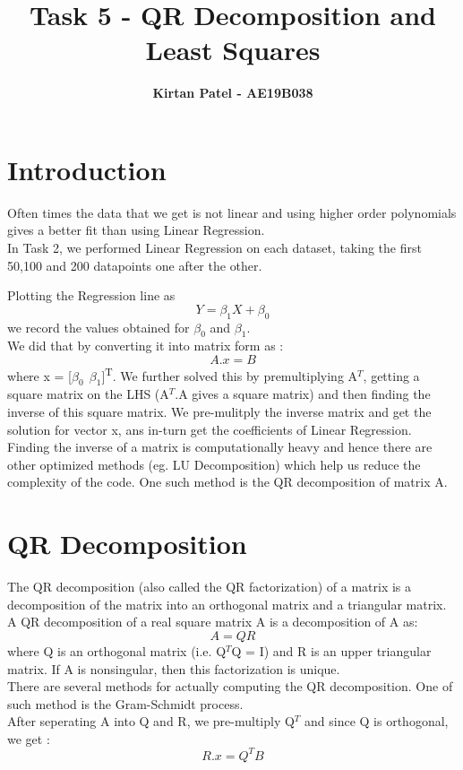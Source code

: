 \documentclass[11pt]{article}
\title{\LARGE{\bf{Task 5 - QR Decomposition and Least Squares }}}
\author{\Large{\bf{Kirtan Patel - AE19B038}}}
\date{}
\begin{document}
\maketitle 

\section{Introduction}
Often times the data that we get is not linear and using higher order polynomials gives a better fit than using Linear Regression.\\

In Task 2,  we performed Linear Regression on each dataset, taking the first 50,100 and 200 datapoints one after the other.

Plotting the Regression line as 
\[Y = \beta_1 X + \beta_0\]
we record the values obtained for $\beta_0$ and $\beta_1$.\\

We did that by converting it into matrix form as : 
\[A.x = B\] 
where x = [$\beta_0~~\beta_1$]\textsuperscript{T}. We further solved this by premultiplying A$^T$, getting a square matrix on the LHS (A$^T$.A gives a square matrix) and then finding the inverse of this square matrix. We pre-mulitply the inverse matrix and get the solution for vector x, ans in-turn get the coefficients of Linear Regression.\\

Finding the inverse of a matrix is computationally heavy and hence there are other optimized methods (eg. LU Decomposition) which help us reduce the complexity of the code. One such method is the QR decomposition of matrix A.

\section{QR Decomposition}
The QR decomposition (also called the QR factorization) of a matrix is a decomposition
of the matrix into an orthogonal matrix and a triangular matrix. A QR decomposition of
a real square matrix A is a decomposition of A as:
\[A = QR\]
where Q is an orthogonal matrix (i.e. Q$^T$Q = I) and R is an upper triangular matrix. If A is nonsingular, then this factorization is unique.\\

There are several methods for actually computing the QR decomposition. One of such
method is the Gram-Schmidt process.\\

After seperating A into Q and R, we pre-multiply Q$^T$ and since Q is orthogonal, we get : 
\[ R.x = Q^T B\]
\end{document}
